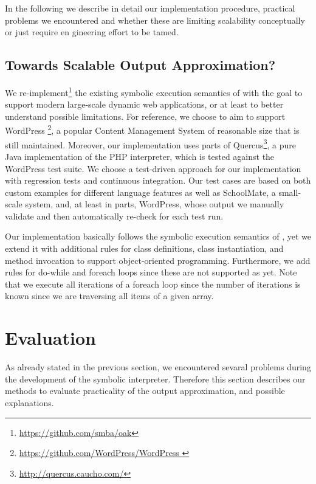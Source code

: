 \documentclass[preprint]{sig-alternate-05-2015}
\begin{document}
In the following we describe in detail our implementation procedure, practical
problems we encountered and whether these are limiting scalability conceptually
or just require en gineering effort to be tamed.

\subsection{Towards Scalable Output Approximation?}
We re-implement\footnote{\url{https://github.com/smba/oak}} the existing
symbolic execution semantics of \cite{Nguyen:2014:BCG:2635868.2635928} with the
goal to support modern large-scale dynamic web applications, or at least to
better understand possible limitations. For reference, we choose to aim to
support  \textsf{WordPress}
\footnote{\url{https://github.com/WordPress/WordPress }}, a popular Content
Management System of reasonable size that is still maintained. Moreover, our
implementation uses parts of
Quercus\footnote{\url{http://quercus.caucho.com/}}, a pure Java implementation
of the PHP interpreter, which is tested against the \textsf{WordPress} test
suite. We choose a test-driven approach for our implementation with regression
tests and continuous integration. Our test cases are based on both custom
examples for different language features as well as \textsf{SchoolMate}, a 
small-scale system, and, at least in parts, \textsf{WordPress}, whose output we
manually validate and then automatically re-check for each test run.

Our implementation basically follows the symbolic execution semantics of
\cite{Nguyen:2014:BCG:2635868.2635928}, yet we extend it with additional rules
for class definitions, class instantiation, and method invocation to support
object-oriented programming. Furthermore, we add rules for do-while and 
foreach loops since these are not supported as yet. Note that we execute all
iterations of a foreach loop since the number of iterations is known since we
 are traversing all items of a given array.

 \section{Evaluation}
As already stated in the previous section, we encountered sevaral problems
during the development of the symbolic interpreter. Therefore this section
describes our methods to evaluate practicality of the output approximation, and
possible explanations.
\end{document}
